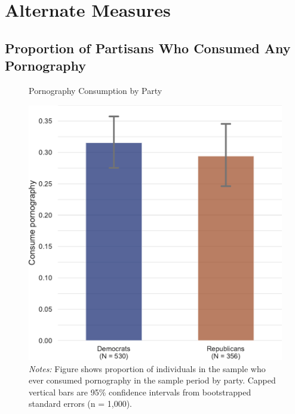 \documentclass[12pt, letterpaper]{article}
\begin{document}
\section{Alternate Measures}

\subsection{Proportion of Partisans Who Consumed Any Pornography}
\begin{figure}
	\centering
	\caption{Pornography Consumption by Party}
	\includegraphics[width=.5\textwidth]{../figs/consume_porn_yes_no.pdf}
	\caption*{\footnotesize \emph{Notes:} 
		Figure shows proportion of individuals in the sample who ever consumed pornography in the sample period by party.
		Capped vertical bars are 95\% confidence intervals from bootstrapped standard errors (n = 1,000).
	}
	\label{fig:consume_porn_yes_no}
\end{figure}
\clearpage
\end{document}
